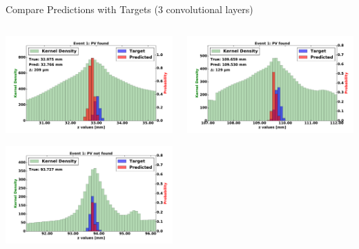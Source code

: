 \begin{frame}{Compare Predictions with Targets (3 convolutional layers)}
  \begin{columns}[c]
        \begin{center}
            \includegraphics[width=1\textwidth,height=0.45\textwidth, trim=18 0 18 0]{images/120000_3layer_04.pdf}
    
            \includegraphics[width=1\textwidth, height=0.45\textwidth,trim=18 0 18 0]{images/120000_3layer_05.pdf}

        \end{center}
        \begin{center}
           \includegraphics[width=1\textwidth, height=0.45\textwidth, trim=18 0 18 0]{images/120000_3layer_06.pdf}
    

\end{center}
\end{columns}
\end{frame}
